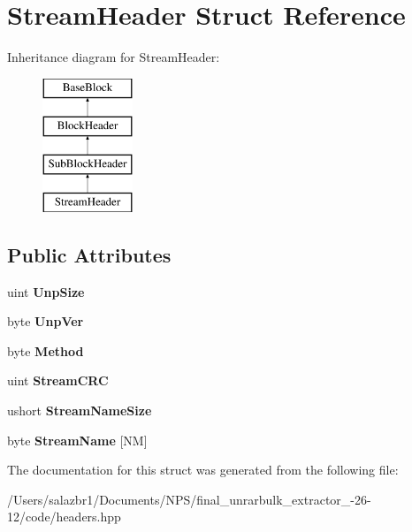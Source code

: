 \hypertarget{struct_stream_header}{\section{Stream\-Header Struct Reference}
\label{struct_stream_header}
}
Inheritance diagram for Stream\-Header\-:\begin{figure}[H]
\begin{center}
\leavevmode
\includegraphics[height=4.000000cm]{struct_stream_header}
\end{center}
\end{figure}
\subsection*{Public Attributes}
\begin{DoxyCompactItemize}
\item 
\hypertarget{struct_stream_header_a73d4e2e55da2a1cd67ac689953fa8267}{uint {\bfseries Unp\-Size}}\label{struct_stream_header_a73d4e2e55da2a1cd67ac689953fa8267}

\item 
\hypertarget{struct_stream_header_aaab515ea2c0fa4a157b7cb5703777734}{byte {\bfseries Unp\-Ver}}\label{struct_stream_header_aaab515ea2c0fa4a157b7cb5703777734}

\item 
\hypertarget{struct_stream_header_aae812161c8878f4e619506b8584a282d}{byte {\bfseries Method}}\label{struct_stream_header_aae812161c8878f4e619506b8584a282d}

\item 
\hypertarget{struct_stream_header_a3e6f5f9cf255825f078ffc5ab2970bca}{uint {\bfseries Stream\-C\-R\-C}}\label{struct_stream_header_a3e6f5f9cf255825f078ffc5ab2970bca}

\item 
\hypertarget{struct_stream_header_a9e021407fd9a3cb90dabfcca17473ff5}{ushort {\bfseries Stream\-Name\-Size}}\label{struct_stream_header_a9e021407fd9a3cb90dabfcca17473ff5}

\item 
\hypertarget{struct_stream_header_ae02fb4782fb0e98ef04a086b7d3994bc}{byte {\bfseries Stream\-Name} \mbox{[}N\-M\mbox{]}}\label{struct_stream_header_ae02fb4782fb0e98ef04a086b7d3994bc}

\end{DoxyCompactItemize}


The documentation for this struct was generated from the following file\-:\begin{DoxyCompactItemize}
\item 
/\-Users/salazbr1/\-Documents/\-N\-P\-S/final\-\_\-unrarbulk\-\_\-extractor\-\_-\/26-\/12/code/headers.\-hpp\end{DoxyCompactItemize}
